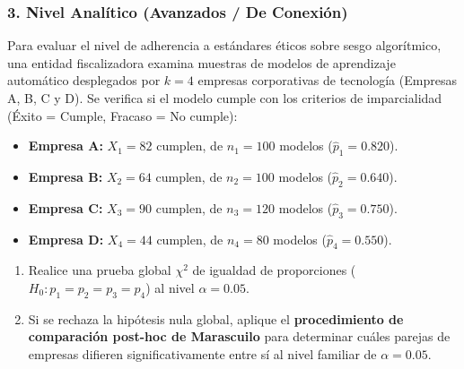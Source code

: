 \subsubsection*{3. Nivel Analítico (Avanzados / De Conexión)}

\begin{problema}
	\label{prob:doc_k_proporciones_marascuilo}
	Para evaluar el nivel de adherencia a estándares éticos sobre sesgo algorítmico, una entidad fiscalizadora examina muestras de modelos de aprendizaje automático desplegados por $k = 4$ empresas corporativas de tecnología (Empresas A, B, C y D). Se verifica si el modelo cumple con los criterios de imparcialidad (Éxito = Cumple, Fracaso = No cumple):
	\begin{itemize}
		\item \textbf{Empresa A:} $X_1 = 82$ cumplen, de $n_1 = 100$ modelos ($\hat{p}_1 = 0.820$).
		\item \textbf{Empresa B:} $X_2 = 64$ cumplen, de $n_2 = 100$ modelos ($\hat{p}_2 = 0.640$).
		\item \textbf{Empresa C:} $X_3 = 90$ cumplen, de $n_3 = 120$ modelos ($\hat{p}_3 = 0.750$).
		\item \textbf{Empresa D:} $X_4 = 44$ cumplen, de $n_4 = 80$ modelos ($\hat{p}_4 = 0.550$).
	\end{itemize}
	\begin{enumerate}
		\item Realice una prueba global $\chi^2$ de igualdad de proporciones ($H_0: p_1=p_2=p_3=p_4$) al nivel $\alpha = 0.05$.
		\item Si se rechaza la hipótesis nula global, aplique el \textbf{procedimiento de comparación post-hoc de Marascuilo} para determinar cuáles parejas de empresas difieren significativamente entre sí al nivel familiar de $\alpha = 0.05$.
	\end{enumerate}
\end{problema}

